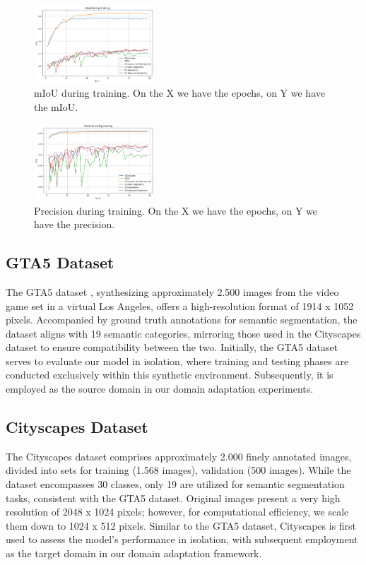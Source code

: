\documentclass[conference]{IEEEtran}
\begin{document}
\begin{figure}[tp]
\centerline{\includegraphics[width=0.4\textwidth]{figures/miou}}
\caption{mIoU during training. On the X we have the epochs, on Y we have the mIoU.}
\label{fig:miou}
\end{figure}

\begin{figure}[tp]
\centerline{\includegraphics[width=0.4\textwidth]{figures/precision}}
\caption{Precision during training. On the X we have the epochs, on Y we have the precision.}
\label{fig:precision}
\end{figure}

\subsection{GTA5 Dataset}
The GTA5 dataset \cite{b4}, synthesizing approximately 2.500 images from the video game set in a virtual Los Angeles, offers a high-resolution format of 1914 x 1052 pixels. Accompanied by ground truth annotations for semantic segmentation, the dataset aligns with 19 semantic categories, mirroring those used in the Cityscapes dataset to ensure compatibility between the two. Initially, the GTA5 dataset serves to evaluate our model in isolation, where training and testing phases are conducted exclusively within this synthetic environment. Subsequently, it is employed as the source domain in our domain adaptation experiments.

\subsection{Cityscapes Dataset}
The Cityscapes dataset \cite{b5} comprises approximately 2.000 finely annotated images, divided into sets for training (1.568 images), validation (500 images). While the dataset encompasses 30 classes, only 19 are utilized for semantic segmentation tasks, consistent with the GTA5 dataset. Original images present a very high resolution of 2048 x 1024 pixels; however, for computational efficiency, we scale them down to 1024 x 512 pixels. Similar to the GTA5 dataset, Cityscapes is first used to assess the model's performance in isolation, with subsequent employment as the target domain in our domain adaptation framework.
\end{document}
